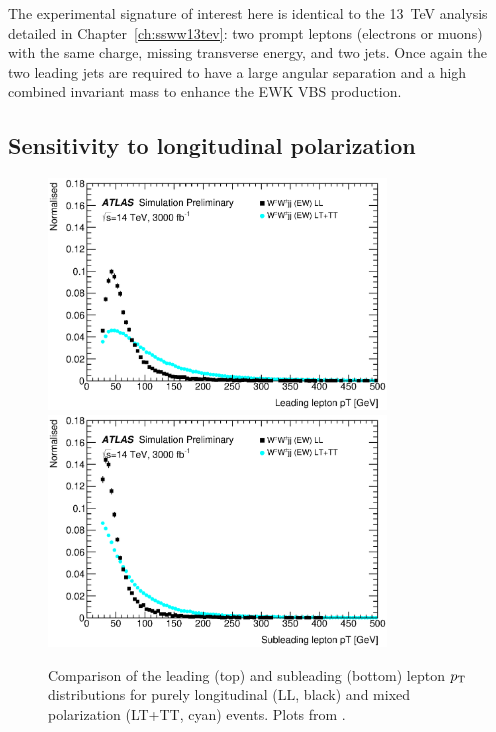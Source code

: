 The experimental signature of interest here is identical to the 13~TeV analysis detailed in Chapter~\ref{ch:ssww13tev}: two prompt leptons (electrons or muons) with the same charge, missing transverse energy, and two jets.
Once again the two leading jets are required to have a large angular separation and a high combined invariant mass to enhance the EWK VBS production.


\subsection{Sensitivity to longitudinal polarization}\label{sec:sswwupgrade_longitudinal_sens}

\begin{figure}[htp]
  \centering
  \includegraphics[width=0.8\textwidth]{figs/ssww_upgrade/polarization/lepton0_pt_pass9}\\
  \includegraphics[width=0.8\textwidth]{figs/ssww_upgrade/polarization/lepton1_pt_pass9}
  \caption{Comparison of the leading (top) and subleading (bottom) lepton $p_{\mathrm{T}}$ distributions for purely longitudinal (LL, black) and mixed polarization (LT+TT, cyan) \ssww events.  Plots from \cite{2018.ssww-upgrade-support}.}
  \label{fig:polarization_leppt}
\end{figure}

